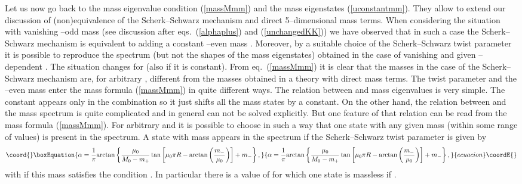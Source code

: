 \documentclass[a4paper,12pt]{article}
\def\arctan{{\rm arctan}}
\def\al{\alpha}
\def\ZZ{\mathbb Z}
\begin{document}
Let us now go back to the mass eigenvalue condition (\ref{massMmm})
and the mass eigenstates (\ref{uconstantmm}). They allow to extend
our discussion of (non)equivalence of the Scherk--Schwarz mechanism
and direct 5--dimensional mass terms. 
When considering the situation with vanishing \myHighlight{$\ZZ_2$}\coordHE{}--odd mass \coordHE{}
(see discussion after eqs.\ (\ref{alphaplus}) and (\ref{unchangedKK}))
we have observed that in such a case the Scherk--Schwarz mechanism is
equivalent to adding a constant \myHighlight{$\ZZ_2$}\coordHE{}--even mass \coordHE{}. Moreover, by
a suitable choice of the Scherk--Schwarz 
twist parameter \myHighlight{$\al$}\coordHE{} it is possible to reproduce the spectrum (but
not the shapes of the mass eigenstates) obtained in the case of
vanishing \myHighlight{$\al$}\coordHE{} and given \coordHE{}--dependent \coordHE{}.
The situation changes for \coordHE{} (also if it is constant). From
eq.\ (\ref{massMmm}) it is clear that the masses in the case of the
Scherk--Schwarz mechanism are, for arbitrary \myHighlight{$\al$}\coordHE{}, different from
the masses obtained in a theory with direct mass terms. 
The twist parameter
\myHighlight{$\al$}\coordHE{} and the \myHighlight{$\ZZ_2$}\coordHE{}--even mass \coordHE{} enter the mass formula
(\ref{massMmm}) in quite different ways.
The relation between \coordHE{} and mass eigenvalues is very simple.
The constant \coordHE{} appears only in the combination \coordHE{} so it
just shifts all the mass states by a constant. 
On the other hand, the relation between \myHighlight{$\al$}\coordHE{} and the mass spectrum
is quite complicated and in general can not be solved explicitly. 
But one feature of that relation can be read from the mass formula
(\ref{massMmm}). For arbitrary \coordHE{} and \coordHE{} it is possible to
choose \myHighlight{$\al$}\coordHE{} in such a way that one state with any given mass (within
some range of values) is present
in the spectrum. A state with mass \coordHE{} appears in the spectrum
if the Scherk--Schwarz twist parameter is given by
\begin{equation}\coord{}\boxEquation{
\al
=
\frac{1}{\pi}
\arctan\left\{\frac{\mu_0}{M_0-m_+}
\tan\left[\mu_0\pi R-\arctan\left(\frac{m_-}{\mu_0}\right)
\right]+m_-\right\}
,
}{
\al
=
\frac{1}{\pi}
\arctan\left\{\frac{\mu_0}{M_0-m_+}
\tan\left[\mu_0\pi R-\arctan\left(\frac{m_-}{\mu_0}\right)
\right]+m_-\right\}
,
}{ecuacion}\coordE{}\end{equation}
with \coordHE{} if this mass satisfies the
condition \coordHE{}. In particular there is a value of \myHighlight{$\al$}\coordHE{}
for which one state is massless if \coordHE{}.
\end{document}
